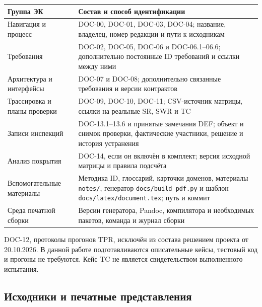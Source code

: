 \documentclass[12pt,a4paper]{article}
\newcounter{none} %
\begin{document}
{\def\LTcaptype{none} %
\begin{longtable}[]{@{}
  >{\raggedright\arraybackslash}p{}
  >{\raggedright\arraybackslash}p{}@{}}
\toprule\noalign{}
\begin{minipage}[b]{\linewidth}\raggedright
Группа ЭК
\end{minipage} & \begin{minipage}[b]{\linewidth}\raggedright
Состав и способ идентификации
\end{minipage} \\
\midrule\noalign{}
\endhead
\bottomrule\noalign{}
\endlastfoot
Навигация и процесс & DOC-00, DOC-01, DOC-03, DOC-04; название, владелец, номер редакции и пути к исходникам \\
Требования & DOC-02, DOC-05, DOC-06 и DOC-06.1--06.6; дополнительно постоянные ID требований и ссылки между ними \\
Архитектура и интерфейсы & DOC-07 и DOC-08; дополнительно связанные требования и версии контрактов \\
Трассировка и планы проверки & DOC-09, DOC-10, DOC-11; CSV-источник матрицы, ссылки на реальные SR, SWR и TC \\
Записи инспекций & DOC-13.1--13.6 и принятые замечания DEF; объект и снимок проверки, фактические участники, решение и история устранения \\
Анализ покрытия & DOC-14, если он включён в комплект; версия исходной матрицы и правила подсчёта \\
Вспомогательные материалы & Методика ID, глоссарий, карточки доменов, материалы \texttt{notes/}, генератор \texttt{docs/\allowbreak{}build\_\allowbreak{}pdf.\allowbreak{}py} и шаблон \texttt{docs/\allowbreak{}latex/\allowbreak{}document.\allowbreak{}tex}; путь и коммит \\
Среда печатной сборки & Версии генератора, Pandoc, компилятора и необходимых пакетов, команда и журнал сборки \\
\end{longtable}
}

DOC-12, протоколы прогонов TPR, исключён из состава решением проекта от 20.10.2026. В данной работе подготавливаются описательные кейсы, тестовый код и прогоны не требуются. Кейс TC не является свидетельством выполненного испытания.

\subsection{Исходники и печатные представления}\label{ux438ux441ux445ux43eux434ux43dux438ux43aux438-ux438-ux43fux435ux447ux430ux442ux43dux44bux435-ux43fux440ux435ux434ux441ux442ux430ux432ux43bux435ux43dux438ux44f}
\end{document}
